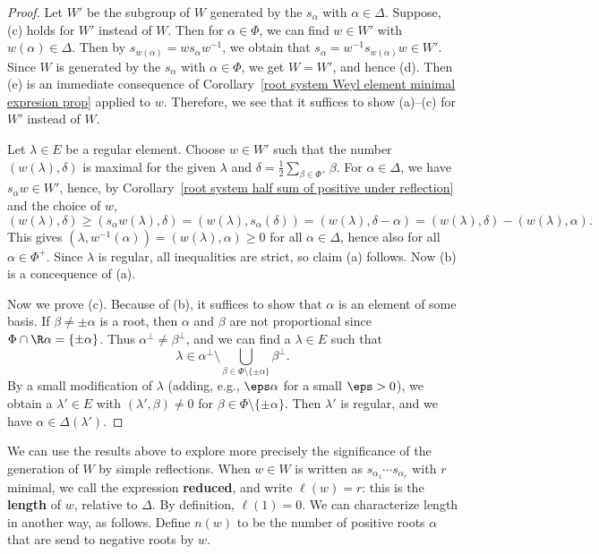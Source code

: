 \begin{proof}
Let $W'$ be the subgroup of $W$ generated by the $s_\alpha$ with $\alpha\in\Delta$. Suppose, (c) holds for $W'$ instead of $W$. Then for $\alpha\in\Phi$, we can find $w\in W'$ with $w(\alpha)\in\Delta$. Then by $s_{w(\alpha)}=ws_\alpha w^{-1}$, we obtain that $s_\alpha=w^{-1}s_{w(\alpha)}w\in W'$. Since $W$ is generated by the $s_\alpha$ with $\alpha\in\Phi$, we get $W=W'$, and hence (d). Then (e) is an immediate consequence of Corollary~\ref{root system Weyl element minimal expresion prop} applied to $w$. Therefore, we see that it suffices to show (a)--(c) for $W'$ instead of $W$.\par
Let $\lambda\in E$ be a regular element. Choose $w\in W'$ such that the number $(w(\lambda),\delta)$ is maximal for the given $\lambda$ and $\delta=\frac{1}{2}\sum_{\beta\in\Phi^+}\beta$. For $\alpha\in\Delta$, we have $s_\alpha w\in W'$, hence, by Corollary~\ref{root system half sum of positive under reflection} and the choice of $w$,
\[(w(\lambda),\delta)\geq(s_\alpha w(\lambda),\delta)=(w(\lambda),s_\alpha(\delta))=(w(\lambda),\delta-\alpha)=(w(\lambda),\delta)-(w(\lambda),\alpha).\]
This gives $(\lambda,w^{-1}(\alpha))=(w(\lambda),\alpha)\geq 0$ for all $\alpha\in\Delta$, hence also for all $\alpha\in\Phi^+$. Since $\lambda$ is regular, all inequalities are strict, so claim (a) follows. Now (b) is a concequence of (a).\par
Now we prove (c). Because of (b), it suffices to show that $\alpha$ is an element of some basis. If $\beta\neq\pm\alpha$ is a root, then $\alpha$ and $\beta$ are not proportional since $\Phi\cap\R\alpha=\{\pm\alpha\}$. Thus $\alpha^\bot\neq\beta^\bot$, and we can find a $\lambda\in E$ such that
\[\lambda\in\alpha^\bot\setminus\bigcup_{\beta\in\Phi\setminus\{\pm\alpha\}}\beta^\bot.\]
By a small modification of $\lambda$ (adding, e.g., $\eps\alpha$ for a small $\eps>0$), we obtain a $\lambda'\in E$ with $(\lambda',\beta)\neq 0$ for $\beta\in\Phi\setminus\{\pm\alpha\}$. Then $\lambda'$ is regular, and we have $\alpha\in\Delta(\lambda')$.
\end{proof}
We can use the results above to explore more precisely the significance of the generation of $W$ by simple reflections. When $w\in W$ is written as $s_{\alpha_1}\cdots s_{\alpha_r}$ with $r$ minimal, we call the expression \textbf{reduced}, and write $\ell(w)=r$: this is the \textbf{length} of $w$, relative to $\Delta$. By definition, $\ell(1)=0$. We can characterize length in another way, as follows. Define $n(w)$ to be the number of positive roots $\alpha$ that are send to negative roots by $w$.
